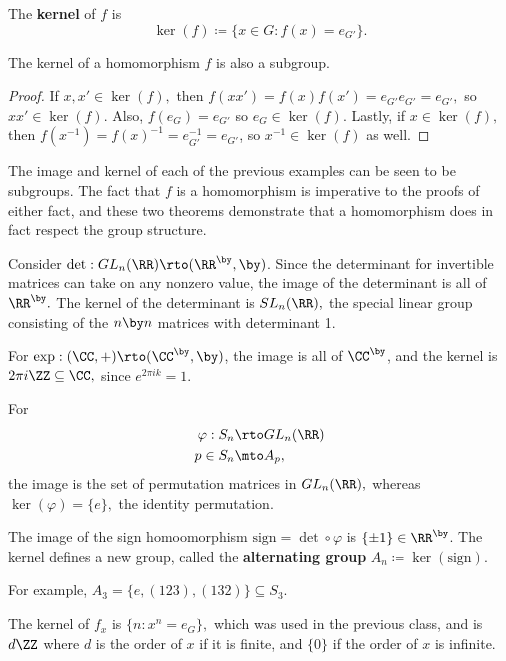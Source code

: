 \begin{definition}
The \textbf{kernel} of $f$ is \[\ker(f) \coloneqq \{x \in G: f(x) = e_{G'}\}.\]


\end{definition}

\begin{theorem}
The kernel of a homomorphism $f$ is also a subgroup.
\end{theorem}
\begin{proof}
If $x, x' \in \ker(f),$ then $f(xx') = f(x)f(x') = e_{G'}e_{G'} = e_{G'},$ so $xx' \in \ker(f)$. Also, $f(e_G) = e_{G'}$ so $e_G \in \ker(f).$ Lastly, if $x \in \ker(f),$ then $f(x^{-1}) =f(x)^{-1} = e_{G'}^{-1} = e_{G'}$, so $x^{-1} \in \ker(f)$ as well.
\end{proof}

The image and kernel of each of the previous examples can be seen to be subgroups. The fact that $f$ is a homomorphism is imperative to the proofs of either fact, and these two theorems demonstrate that a homomorphism does in fact respect the group structure.
\begin{example}
Consider $\text{det}: GL_n(\RR) \rto (\RR^{\by}, \by)$. Since the determinant for invertible matrices can take on any nonzero value, the image of the determinant is all of $\RR^{\by}.$ The kernel of the determinant is $SL_n(\RR),$ the special linear group consisting of the $n \by n$ matrices with determinant 1.
\end{example}
\begin{example}
For $\text{exp}: (\CC, +) \rto (\CC^{\by}, \by)$, the image is all of $\CC^{\by}$, and the kernel is $2\pi i\ZZ \subseteq \CC,$ since $e^{2\pi ik} = 1.$
\end{example}
\begin{example}
For \begin{align*}
\varphi: S_n &\rto GL_n(\RR) \\
p\in S_n &\mto A_p,
\end{align*} the image is the set of permutation matrices in $GL_n(\RR),$ whereas $\ker(\varphi) = \{e\},$ the identity permutation.
\end{example}
\begin{example}
The image of the sign homoomorphism $\text{sign} = \det \circ \varphi$ is $\{\pm 1\} \in \RR^{\by}$. The kernel defines a new group, called the \textbf{alternating group} $A_n \coloneqq \ker(\text{sign}).$
\end{example}

For example, $A_3 = \{e, (123), (132)\} \subseteq S_3.$
\begin{example}
The kernel of $f_x$ is $\{n: x^n = e_G\},$ which was used in the previous class, and is $d\ZZ$ where $d$ is the order of $x$ if it is finite, and $\{0\}$ if the order of $x$ is infinite. 
\end{example}

